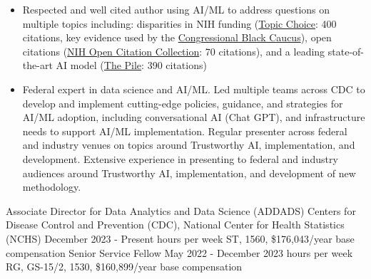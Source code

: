 \documentclass[]{scrartcl}
\begin{document}
\begin{cleanCV}

   \vspace{-1em}

   {
  \vspace{-0.25em}
  \begin{itemize}

      \item Respected and well cited author using AI/ML to address questions on multiple topics including: disparities in NIH funding (\href{https://www.science.org/doi/10.1126/sciadv.aaw7238}{Topic Choice}: 400 citations, key evidence used by the \href{https://bluntrochester.house.gov/uploadedfiles/191220_ltr_to_nih_about_grant_disparities.pdf}{Congressional Black Caucus}), open citations (\href{https://www.ncbi.nlm.nih.gov/pmc/articles/PMC6786512/}{NIH Open Citation Collection}: 70 citations), and a leading state-of-the-art AI model (\href{https://arxiv.org/abs/2101.00027}{The Pile}: 390 citations)

      \item Federal expert in data science and AI/ML. Led multiple teams across CDC to develop and implement cutting-edge policies, guidance, and strategies for AI/ML adoption, including conversational AI (Chat GPT), and infrastructure needs to support AI/ML implementation. Regular presenter across federal and industry venues on topics around Trustworthy AI, implementation, and development. Extensive experience in presenting to federal and industry audiences around Trustworthy AI, implementation, and development of new methodology.

  \end{itemize}
}


  \vspace{-1em}

\WorkExperience
{}
{Associate Director for Data Analytics and Data Science (ADDADS)}
{
  \newline Centers for Disease Control and Prevention (CDC), National Center for Health Statistics (NCHS)
  \newline December 2023 - Present
   hours per week
  \newline ST, 1560, \$176,043/year base compensation
  \newline
  \newline Senior Service Fellow
  \newline May 2022 - December 2023
   hours per week
  \newline RG, GS-15/2, 1530, \$160,899/year base compensation
}
{
  \vspace{-0.25em}
  \begin{itemize}


\end{itemize}}
\end{cleanCV}
\end{document}
